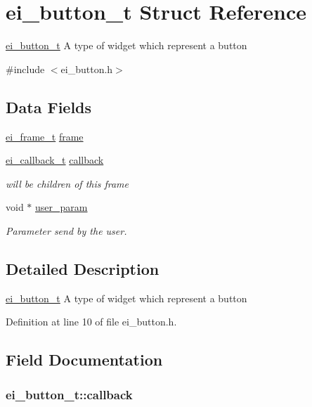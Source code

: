 \hypertarget{structei__button__t}{\section{ei\+\_\+button\+\_\+t Struct Reference}
\label{structei__button__t}
}


\hyperlink{structei__button__t}{ei\+\_\+button\+\_\+t} A type of widget which represent a button  




{\ttfamily \#include $<$ei\+\_\+button.\+h$>$}

\subsection*{Data Fields}
\begin{DoxyCompactItemize}
\item 
\hyperlink{structei__frame__t}{ei\+\_\+frame\+\_\+t} \hyperlink{structei__button__t_ae72bf3615425f3565c74f0883646d8b9}{frame}
\item 
\hyperlink{ei__widget_8h_a3692fee0affca071917f22f2ec2018a4}{ei\+\_\+callback\+\_\+t} \hyperlink{structei__button__t_a04b8acb3983a00fa7850584900cd4664}{callback}
\begin{DoxyCompactList}\small\item\em will be children of this frame \end{DoxyCompactList}\item 
void $\ast$ \hyperlink{structei__button__t_a56591ce45c0b47abf6ce150d5beef366}{user\+\_\+param}
\begin{DoxyCompactList}\small\item\em Parameter send by the user. \end{DoxyCompactList}\end{DoxyCompactItemize}


\subsection{Detailed Description}
\hyperlink{structei__button__t}{ei\+\_\+button\+\_\+t} A type of widget which represent a button 

Definition at line 10 of file ei\+\_\+button.\+h.



\subsection{Field Documentation}
\hypertarget{structei__button__t_a04b8acb3983a00fa7850584900cd4664}{
\subsubsection[{callback}]{ ei\+\_\+button\+\_\+t\+::callback}}\label{structei__button__t_a04b8acb3983a00fa7850584900cd4664}


